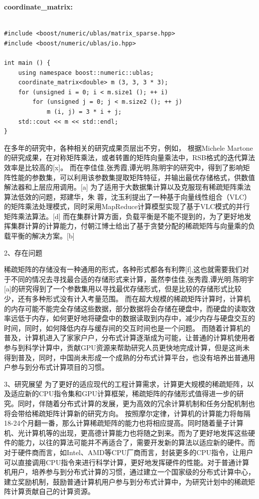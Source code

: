 \documentclass{article}
\begin{document}
\textbf{coordinate\_matrix:}
\begin{lstlisting}

#include <boost/numeric/ublas/matrix_sparse.hpp>
#include <boost/numeric/ublas/io.hpp>

int main () {
    using namespace boost::numeric::ublas;
    coordinate_matrix<double> m (3, 3, 3 * 3);
    for (unsigned i = 0; i < m.size1 (); ++ i)
        for (unsigned j = 0; j < m.size2 (); ++ j)
            m (i, j) = 3 * i + j;
    std::cout << m << std::endl;
}
\end{lstlisting}

在多年的研究中，各种相关的研究成果页层出不穷，例如，
根据Michele Martone的研究成果，在对称矩阵乘法，或者转置的矩阵向量乘法中，RSB格式的迭代算法效率是比较高的[x]。
而在李佳佳,张秀霞,谭光明,陈明宇的研究中，得到了影响矩阵性能的参数集，可以利用该参数集提取矩阵特征，并输出最优存储格式，供数值解法器和上层应用调用。[a]
为了适用于大数据集计算以及克服现有稀疏矩阵乘法算法低效的问题，郑建华，朱 蓉，沈玉利提出了一种基于向量线性组合（VLC）的矩阵乘法处理模式，同时采用MapReduce计算模型实现了基于VLC模式的并行矩阵乘法算法。[d]
而在集群计算方面，负载平衡是不能不提到的，为了更好地发挥集群计算的计算能力，付朝江博士给出了基于贪婪分配的稀疏矩阵与向量乘的负载平衡的解决方案。[b]
\newline

2、存在问题\newline

稀疏矩阵的存储没有一种通用的形式，各种形式都各有利弊[f],这也就需要我们对于不同的情况去寻找最合适的存储形式来计算，虽然李佳佳,张秀霞,谭光明,陈明宇[a]的研究得到了一个参数集用以寻找最优存储形式，但是比较的存储形式比较少，还有多种形式没有计入考量范围。
\newline
而在超大规模的稀疏矩阵计算时，计算机的内存可能不能完全存储这些数据，部分数据将会存储在硬盘中，而硬盘的读取效率远低于内存，如何更好地将硬盘中的数据读取到内存中，减少内存与硬盘交互的时间，同时，如何降低内存与缓存间的交互时间也是一个问题。
\newline
而随着计算机的普及，计算机进入了家家户户，分布式计算逐渐成为可能，让普通的计算机使用者参与到科学计算中，贡献GPU资源来帮助研究人员更快地完成计算，但是这尚未得到普及，同时，中国尚未形成一个成熟的分布式计算平台，也没有培养出普通用户参与到分布式计算项目的习惯。\newline



3、研究展望\newline
为了更好的适应现代的工程计算需求，计算更大规模的稀疏矩阵，以及适应新的CPU指令集和GPU计算框架，稀疏矩阵的存储形式值得进一步的研究。同时，伴随着分布式计算的发展，更为高效的冗余计算机制和任务分配机制也将会带给稀疏矩阵计算新的研究方向。
按照摩尔定律，计算机的计算能力将毎隔18-24个月翻一番，那么计算稀疏矩阵的能力也将相应提高。同时随着量子计算机、光计算机等的出现，更高德计算能力也将随之到来。而为了更好地发挥这些硬件的能力，以往的算法可能并不再适合了，需要开发新的算法以适应新的硬件。而对于硬件商而言，如Intel、AMD等CPU厂商而言，封装更多的CPU指令，让用户可以直接调用CPU指令来进行科学计算，更好地发挥硬件的性能。对于普通计算机用户，培养参与到分布式计算的习惯，通过建立一个国家级的分布式计算中心，建立奖励机制，鼓励普通计算机用户参与到分布式计算中，为研究计划中的稀疏矩阵计算贡献自己的计算资源。\newline
\end{document}
